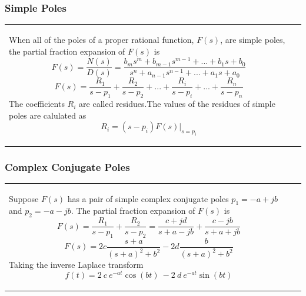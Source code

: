 \documentclass[aspectratio=169]{beamer}
\begin{document}
\begin{frame}[fragile]
	\frametitle{Simple Poles }
\begin{tabular}{ll}

	\begin{columns}
	\small	\begin{column}{1\textwidth}  %

	When all of the poles of a proper rational function, $F(s)$, are simple poles, the partial fraction
expansion of $F(s)$ is
	$$F(s)=\dfrac{N(s)}{D(s)}=\dfrac{b_ms^m+b_{m-1}s^{m-1}+...+b_{1}s+b_{0}}{s^n+a_{n-1}s^{n-1}+...+a_{1}s+a_{0}} $$
	$$F(s)=\dfrac{R_1}{s-p_1}+\dfrac{R_2}{s-p_2}+...+\dfrac{R_i}{s-p_i}+...+\dfrac{R_n}{s-p_n} $$
	The coefficients $R_i$ are called residues.The values of the residues of simple poles are calulated as	
	$$R_i=(s-p_i)F(s) \big |_{s=p_i}$$

					

		\end{column}

	
	\end{columns}\\


\end{tabular}	
\end{frame}
\begin{frame}[fragile]
	\frametitle{Complex Conjugate Poles}
\begin{tabular}{ll}

	\begin{columns}
	\small	\begin{column}{1\textwidth}  %

	Suppose $F(s)$ has a pair of simple complex conjugate poles $p_1=-a+jb$ and $p_2=-a-jb$. The partial fraction
expansion of $F(s)$ is
	$$F(s)=\dfrac{R_1}{s-p_1}+\dfrac{R_2}{s-p_2} = \dfrac{c+jd}{s+a-jb}+\dfrac{c-jb}{s+a+jb}$$
	$$F(s)=2c\dfrac{s+a}{(s+a)^2+b^2}-2d\dfrac{b}{(s+a)^2+b^2} $$
	Taking the inverse Laplace transform	
	$$f(t)=2 \ c \ e^{-at} \cos(bt) \ - 2 \ d \ e^{-at}  \sin(bt)$$
	\end{column}	
	\end{columns}\\
\end{tabular}	
\end{frame}
\end{document}
